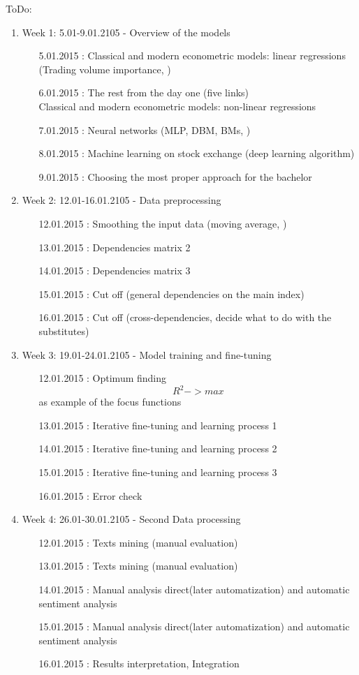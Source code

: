 \documentclass {article}
\begin{document}
ToDo:
\begin{enumerate}
	\item Week 1: 5.01-9.01.2105 - Overview of the models 
	\begin{enumerate}
		\item[5.01.2015]: Classical and modern econometric models:  linear regressions (Trading volume importance, )
		\item[6.01.2015]: The rest from the day one (five links)\\
						  Classical and modern econometric models:  non-linear regressions
		\item[7.01.2015]: Neural networks (MLP, DBM, BMs, )
		\item[8.01.2015]: Machine learning on stock exchange (deep learning algorithm)
		\item[9.01.2015]: Choosing the most proper approach for the bachelor
	\end{enumerate}
	\item Week 2: 12.01-16.01.2105 - Data preprocessing
	\begin{enumerate}
		\item[12.01.2015]: Smoothing the input data (moving average, )
		\item[13.01.2015]: Dependencies matrix 2
		\item[14.01.2015]: Dependencies matrix 3
		\item[15.01.2015]: Cut off (general dependencies on the main index)
		\item[16.01.2015]: Cut off (cross-dependencies, decide what to do with the substitutes)
	\end{enumerate}
	\item Week 3: 19.01-24.01.2105 - Model training and fine-tuning
	\begin{enumerate}
		\item[12.01.2015]: Optimum finding  \[ R^2 -> max \] as example of the focus functions
		\item[13.01.2015]: Iterative fine-tuning and learning process 1
		\item[14.01.2015]: Iterative fine-tuning and learning process 2
		\item[15.01.2015]: Iterative fine-tuning and learning process 3
		\item[16.01.2015]: Error check
	\end{enumerate}
	\item Week 4: 26.01-30.01.2105 - Second Data processing
	\begin{enumerate}
		\item[12.01.2015]: Texts mining (manual evaluation) 
		\item[13.01.2015]: Texts mining (manual evaluation)
		\item[14.01.2015]: Manual analysis direct(later automatization) and automatic sentiment analysis
		\item[15.01.2015]: Manual analysis direct(later automatization) and automatic sentiment analysis
		\item[16.01.2015]: Results interpretation, Integration 
	\end{enumerate}
\end{enumerate}
\end{document}
